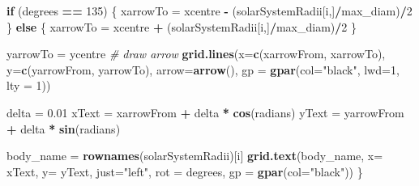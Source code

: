 \documentclass[9pt,letter]{article}
\newenvironment{Shaded}{\begin{snugshade}}{\end{snugshade}}
\newcommand{\KeywordTok}[1]{\textcolor[rgb]{0.13,0.29,0.53}{\textbf{#1}}}
\newcommand{\DataTypeTok}[1]{\textcolor[rgb]{0.13,0.29,0.53}{#1}}
\newcommand{\DecValTok}[1]{\textcolor[rgb]{0.00,0.00,0.81}{#1}}
\newcommand{\FloatTok}[1]{\textcolor[rgb]{0.00,0.00,0.81}{#1}}
\newcommand{\StringTok}[1]{\textcolor[rgb]{0.31,0.60,0.02}{#1}}
\newcommand{\CommentTok}[1]{\textcolor[rgb]{0.56,0.35,0.01}{\textit{#1}}}
\newcommand{\ControlFlowTok}[1]{\textcolor[rgb]{0.13,0.29,0.53}{\textbf{#1}}}
\newcommand{\OperatorTok}[1]{\textcolor[rgb]{0.81,0.36,0.00}{\textbf{#1}}}
\newcommand{\NormalTok}[1]{#1}
\begin{document}
\begin{Shaded}
\begin{Highlighting}[]
  \ControlFlowTok{if}\NormalTok{ (degrees }\OperatorTok{==}\StringTok{ }\DecValTok{135}\NormalTok{) \{}
\NormalTok{    xarrowTo =}\StringTok{ }\NormalTok{xcentre }\OperatorTok{-}\StringTok{ }\NormalTok{(solarSystemRadii[i,]}\OperatorTok{/}\NormalTok{max_diam)}\OperatorTok{/}\DecValTok{2}
\NormalTok{  \} }\ControlFlowTok{else}\NormalTok{ \{}
\NormalTok{    xarrowTo =}\StringTok{ }\NormalTok{xcentre }\OperatorTok{+}\StringTok{ }\NormalTok{(solarSystemRadii[i,]}\OperatorTok{/}\NormalTok{max_diam)}\OperatorTok{/}\DecValTok{2}
\NormalTok{  \}}
  
\NormalTok{  yarrowTo =}\StringTok{ }\NormalTok{ycentre}
  \CommentTok{# draw arrow}
  \KeywordTok{grid.lines}\NormalTok{(}\DataTypeTok{x=}\KeywordTok{c}\NormalTok{(xarrowFrom, xarrowTo), }\DataTypeTok{y=}\KeywordTok{c}\NormalTok{(yarrowFrom, yarrowTo), }
             \DataTypeTok{arrow=}\KeywordTok{arrow}\NormalTok{(),}
             \DataTypeTok{gp =} \KeywordTok{gpar}\NormalTok{(}\DataTypeTok{col=}\StringTok{"black"}\NormalTok{, }\DataTypeTok{lwd=}\DecValTok{1}\NormalTok{, }\DataTypeTok{lty =} \DecValTok{1}\NormalTok{))}
  
\NormalTok{  delta =}\StringTok{ }\FloatTok{0.01}
\NormalTok{  xText =}\StringTok{ }\NormalTok{xarrowFrom }\OperatorTok{+}\StringTok{ }\NormalTok{delta }\OperatorTok{*}\StringTok{ }\KeywordTok{cos}\NormalTok{(radians)}
\NormalTok{  yText =}\StringTok{ }\NormalTok{yarrowFrom }\OperatorTok{+}\StringTok{ }\NormalTok{delta }\OperatorTok{*}\StringTok{ }\KeywordTok{sin}\NormalTok{(radians)}
  
\NormalTok{  body_name =}\StringTok{ }\KeywordTok{rownames}\NormalTok{(solarSystemRadii)[i]}
  \KeywordTok{grid.text}\NormalTok{(body_name, }\DataTypeTok{x=}\NormalTok{ xText, }\DataTypeTok{y=}\NormalTok{ yText,}
            \DataTypeTok{just=}\StringTok{"left"}\NormalTok{, }\DataTypeTok{rot =}\NormalTok{ degrees,}
            \DataTypeTok{gp =} \KeywordTok{gpar}\NormalTok{(}\DataTypeTok{col=}\StringTok{"black"}\NormalTok{))}
\NormalTok{\}}
\end{Highlighting}
\end{Shaded}
\end{document}
